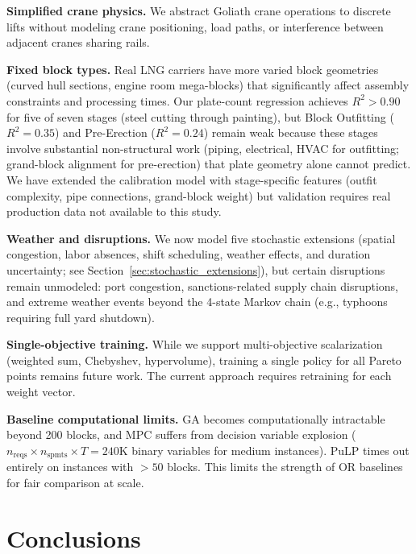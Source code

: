 \documentclass[11pt,a4paper]{article}
\begin{document}
\textbf{Simplified crane physics.}
We abstract Goliath crane operations to discrete lifts without modeling crane positioning, load paths, or interference between adjacent cranes sharing rails.

\textbf{Fixed block types.}
Real LNG carriers have more varied block geometries (curved hull sections, engine room mega-blocks) that significantly affect assembly constraints and processing times.
Our plate-count regression achieves $R^2 > 0.90$ for five of seven stages (steel cutting through painting), but Block Outfitting ($R^2 = 0.35$) and Pre-Erection ($R^2 = 0.24$) remain weak because these stages involve substantial non-structural work (piping, electrical, HVAC for outfitting; grand-block alignment for pre-erection) that plate geometry alone cannot predict. We have extended the calibration model with stage-specific features (outfit complexity, pipe connections, grand-block weight) but validation requires real production data not available to this study.

\textbf{Weather and disruptions.}
We now model five stochastic extensions (spatial congestion, labor absences, shift scheduling, weather effects, and duration uncertainty; see Section~\ref{sec:stochastic_extensions}), but certain disruptions remain unmodeled: port congestion, sanctions-related supply chain disruptions, and extreme weather events beyond the 4-state Markov chain (e.g., typhoons requiring full yard shutdown).

\textbf{Single-objective training.}
While we support multi-objective scalarization (weighted sum, Chebyshev, hypervolume), training a single policy for all Pareto points remains future work.
The current approach requires retraining for each weight vector.

\textbf{Baseline computational limits.}
GA becomes computationally intractable beyond 200 blocks, and MPC suffers from decision variable explosion ($n_\text{reqs} \times n_\text{spmts} \times T = 240$K binary variables for medium instances).
PuLP times out entirely on instances with $>50$ blocks.
This limits the strength of OR baselines for fair comparison at scale.

\section{Conclusions}
\label{sec:conclusions}
\end{document}
